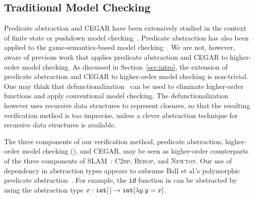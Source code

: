 
\subsection{Traditional Model Checking}

Predicate abstraction and CEGAR have been extensively studied in the 
context of finite state or pushdown model 
checking~\cite{Graf1997,Ball2001,Ball2002,Ball2005,Clarke2003a,Henzinger2002,Henzinger2004,Heizmann2010}. 
%
Predicate abstraction has also been applied to the game-semantics-based 
model checking~\cite{Bakewell2009}. We are not, however, aware of 
previous work that applies predicate abstraction and CEGAR to 
higher-order model checking. As discussed in Section~\ref{sec:intro}, 
the extension of predicate abstraction and CEGAR to higher-order model 
checking is non-trivial. One may think that 
defunctionalization~\cite{Reynolds1972} can be used to eliminate 
higher-order functions and apply conventional model checking. The 
defunctionalization however uses recursive data structures to represent 
closures, so that the resulting verification method is too imprecise, 
unless a clever abstraction technique for recursive data structures is 
available.

%
The three components of our verification method, predicate abstraction, 
higher-order model checking (\trecs{}), and CEGAR, may be seen as 
higher-order counterparts of the three components of 
SLAM~\cite{Ball2001,Ball2002,Ball2005}: \textsc{C2bp}, \textsc{Bebop}, 
and \textsc{Newton}.
%
Our use of dependency in abstraction types appears to subsume Ball et 
al.'s polymorphic predicate abstraction~\cite{Ball2005}. For example, 
the \texttt{id} function in \cite{Ball2005} can be abstracted by using 
the abstraction type {\(x:\mathtt{int}[\,] \to \mathtt{int}[\lambda y.y=x]\)}.

